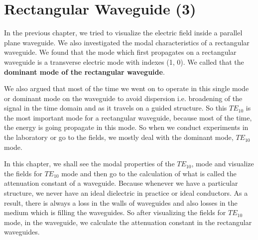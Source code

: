 \chapter{Rectangular Waveguide (3)}
In the previous chapter, we tried to visualize the electric field inside a parallel plane waveguide. We also investigated the modal characteristics of a rectangular waveguide. We found that the mode which first propagates on a rectangular waveguide is a transverse electric mode with indexes (1, 0). We called that the \textbf{dominant mode of the rectangular waveguide}. 
	
We also argued that most of the time we went on to operate in this single mode or dominant mode on the waveguide to avoid dispersion i.e. broadening of the signal in the time domain and as it travels on a guided structure. So this $TE_{10}$  is the most important mode for a rectangular waveguide, because most of the time, the energy is going propagate in this mode. So when we conduct experiments in the laboratory or go to the fields, we mostly deal with the dominant mode,  $TE_{10}$ mode.

In this chapter, we shall see the modal properties of the $TE_{10}$, mode and visualize the fields for $TE_{10}$ mode and then go to the calculation of what is called the attenuation constant of a waveguide. Because whenever we have a particular structure, we never have an ideal dielectric in practice or ideal conductors. As a result, there is always a loss in the walls of waveguides and also losses in the medium which is filling the waveguides. So after visualizing the fields for $TE_{10}$ mode, in the waveguide, we calculate the attenuation constant in the rectangular waveguides.

